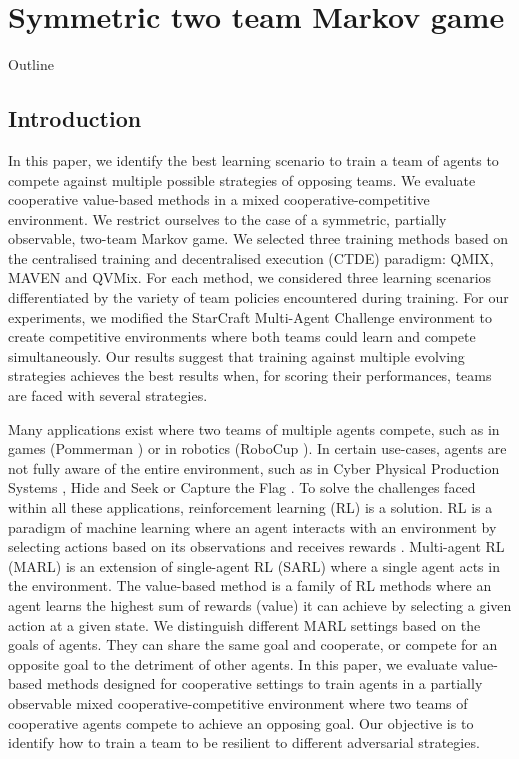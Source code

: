 \chapter{Symmetric two team Markov game}\label{ch:2teams}
\begin{chapter_outline}
Outline \citep{leroy2022twoteam}
\end{chapter_outline}

\section{Introduction}


In this paper, we identify the best learning scenario to train a team of agents to compete against multiple possible strategies of opposing teams.
We evaluate cooperative value-based methods in a mixed cooperative-competitive environment.
We restrict ourselves to the case of a symmetric, partially observable, two-team Markov game.
We selected three training methods based on the centralised training and decentralised execution (CTDE) paradigm: QMIX, MAVEN and QVMix.
For each method, we considered three learning scenarios differentiated by the variety of team policies encountered during training.
For our experiments, we modified the StarCraft Multi-Agent Challenge environment to create competitive environments where both teams could learn and compete simultaneously.
Our results suggest that training against multiple evolving strategies achieves the best results when, for scoring their performances, teams are faced with several strategies.


Many applications exist where two teams of multiple agents compete, such as in games (Pommerman \citep{resnick2018pommerman}) or in robotics (RoboCup \citep{kitano1997robocup}).
In certain use-cases, agents are not fully aware of the entire environment, such as in Cyber Physical Production Systems \citep{phan2020learning}, Hide and Seek \citep{baker2019emergent} or Capture the Flag \citep{jaderberg2019human}.
To solve the challenges faced within all these applications, reinforcement learning (RL) is a solution.
RL is a paradigm of machine learning where an agent interacts with an environment by selecting actions based on its observations and receives rewards \citep{sutton2018reinforcement}.
Multi-agent RL (MARL) is an extension of single-agent RL (SARL) where a single agent acts in the environment.
The value-based method is a family of RL methods where an agent learns the highest sum of rewards (value) it can achieve by selecting a given action at a given state.
We distinguish different MARL settings based on the goals of agents. 
They can share the same goal and cooperate, or compete for an opposite goal to the detriment of other agents.
In this paper, we evaluate value-based methods designed for cooperative settings to train agents in a partially observable mixed cooperative-competitive environment where two teams of cooperative agents compete to achieve an opposing goal. Our objective is to identify how to train a team to be resilient to different adversarial strategies.

